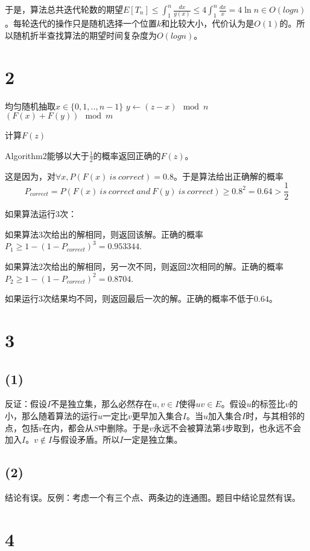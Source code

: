 \documentclass{ctexart}
\begin{document}
于是，算法总共迭代轮数的期望$E[T_n]\le \int_1^n \frac{dx}{g(x)} \le 4\int_1^n \frac{dx}{x} = 4\ln n \in O(log n)$。每轮迭代的操作只是随机选择一个位置$k$和比较大小，代价认为是$O(1)$的。所以随机折半查找算法的期望时间复杂度为$O(logn)$。

\section*{2}
\begin{algorithm}[H]
  \SetAlgoLined
  均匀随机抽取$x\in\{0,1,..,n-1\}$\;
  $y\leftarrow (z-x) \mod n$\;
  \Return $(F(x)+F(y)) \mod m$
  \caption{计算$F(z)$}
\end{algorithm}

Algorithm2能够以大于$\frac{1}{2}$的概率返回正确的$F(z)$。

这是因为，对$\forall x,P(F(x)\ is \ correct)=0.8$。于是算法给出正确解的概率
$$
P_{correct} = P(F(x)\ is\ correct\ and\  F(y)\ is \ correct)\ge 0.8^2 = 0.64 > \frac{1}{2}
$$

如果算法运行3次：

如果算法3次给出的解相同，则返回该解。正确的概率$P_1 \ge 1-(1-P_{correct})^3 = 0.953344$.

如果算法2次给出的解相同，另一次不同，则返回2次相同的解。正确的概率$P_2 \ge 1-(1-P_{correct})^2 = 0.8704$.

如果运行3次结果均不同，则返回最后一次的解。正确的概率不低于$0.64$。



\section*{3}
\subsection*{(1)}

反证：假设$I$不是独立集，那么必然存在$u,v \in I$使得$uv \in E$。假设$u$的标签比$v$的小，那么随着算法的运行$u$一定比$v$更早加入集合$I$。当$u$加入集合$I$时，与其相邻的点，包括$v$在内，都会从$S$中删除。于是$v$永远不会被算法第4步取到，也永远不会加入$I$。$v\notin I$与假设矛盾。所以$I$一定是独立集。

\subsection*{(2)}
结论有误。反例：考虑一个有三个点、两条边的连通图。题目中结论显然有误。


\section*{4}
\end{document}
